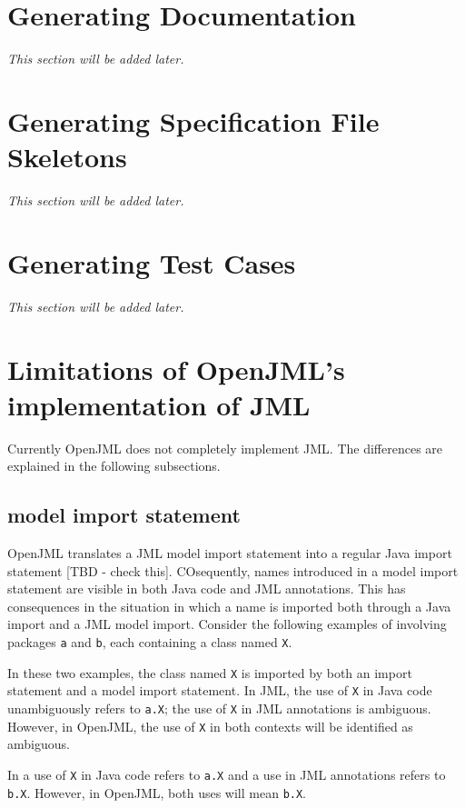 \section{Generating Documentation}
\textit{This section will be added later.} %

\section{Generating Specification File Skeletons}
\textit{This section will be added later.} %

\section{Generating Test Cases}
\textit{This section will be added later.} %

\section{Limitations of OpenJML's implementation of JML}
Currently OpenJML does not completely implement JML. The differences are explained in the following subsections.

\subsection{model import statement}
OpenJML translates a JML model import statement into a regular Java import statement [TBD - check this].
COsequently, names introduced in a model import statement are visible in both Java code and JML annotations.
This has consequences in the situation in which a name is imported both through a Java import and a JML model import.
Consider the following examples of involving packages \texttt{a} and \texttt{b}, each containing a class named 
\texttt{X}.

In these two examples,
the class named \texttt{X} is imported by both an import statement and a model import statement. In JML, the use of \texttt{X} in
Java code unambiguously refers to \texttt{a.X}; the use of \texttt{X} in JML annotations is ambiguous. However, in OpenJML,
the use of \texttt{X} in both contexts will be identified as ambiguous.

In
a use of \texttt{X} in Java code refers to \texttt{a.X} and a use in JML annotations refers to \texttt{b.X}.
However, in OpenJML, both uses will mean \texttt{b.X}.

